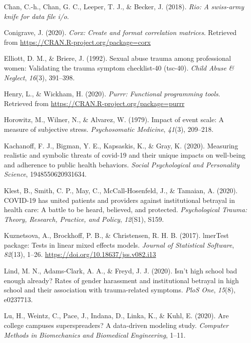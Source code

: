 \documentclass[
  english,
  man, noextraspace]{apa6}
\begin{document}
\leavevmode\hypertarget{ref-R-rio}{}%
Chan, C.-h., Chan, G. C., Leeper, T. J., \& Becker, J. (2018). \emph{Rio: A swiss-army knife for data file i/o}.

\leavevmode\hypertarget{ref-R-corx}{}%
Conigrave, J. (2020). \emph{Corx: Create and format correlation matrices}. Retrieved from \url{https://CRAN.R-project.org/package=corx}

\leavevmode\hypertarget{ref-elliott1992}{}%
Elliott, D. M., \& Briere, J. (1992). Sexual abuse trauma among professional women: Validating the trauma symptom checklist-40 (tsc-40). \emph{Child Abuse \& Neglect}, \emph{16}(3), 391--398.

\leavevmode\hypertarget{ref-R-purrr}{}%
Henry, L., \& Wickham, H. (2020). \emph{Purrr: Functional programming tools}. Retrieved from \url{https://CRAN.R-project.org/package=purrr}

\leavevmode\hypertarget{ref-horowitz1979}{}%
Horowitz, M., Wilner, N., \& Alvarez, W. (1979). Impact of event scale: A measure of subjective stress. \emph{Psychosomatic Medicine}, \emph{41}(3), 209--218.

\leavevmode\hypertarget{ref-kachanoff2020}{}%
Kachanoff, F. J., Bigman, Y. E., Kapsaskis, K., \& Gray, K. (2020). Measuring realistic and symbolic threats of covid-19 and their unique impacts on well-being and adherence to public health behaviors. \emph{Social Psychological and Personality Science}, 1948550620931634.

\leavevmode\hypertarget{ref-klest2020}{}%
Klest, B., Smith, C. P., May, C., McCall-Hosenfeld, J., \& Tamaian, A. (2020). COVID-19 has united patients and providers against institutional betrayal in health care: A battle to be heard, believed, and protected. \emph{Psychological Trauma: Theory, Research, Practice, and Policy}, \emph{12}(S1), S159.

\leavevmode\hypertarget{ref-R-lmerTest}{}%
Kuznetsova, A., Brockhoff, P. B., \& Christensen, R. H. B. (2017). lmerTest package: Tests in linear mixed effects models. \emph{Journal of Statistical Software}, \emph{82}(13), 1--26. \url{https://doi.org/10.18637/jss.v082.i13}

\leavevmode\hypertarget{ref-lind2020}{}%
Lind, M. N., Adams-Clark, A. A., \& Freyd, J. J. (2020). Isn't high school bad enough already? Rates of gender harassment and institutional betrayal in high school and their association with trauma-related symptoms. \emph{PloS One}, \emph{15}(8), e0237713.

\leavevmode\hypertarget{ref-lu2020college}{}%
Lu, H., Weintz, C., Pace, J., Indana, D., Linka, K., \& Kuhl, E. (2020). Are college campuses superspreaders? A data-driven modeling study. \emph{Computer Methods in Biomechanics and Biomedical Engineering}, 1--11.
\end{document}
